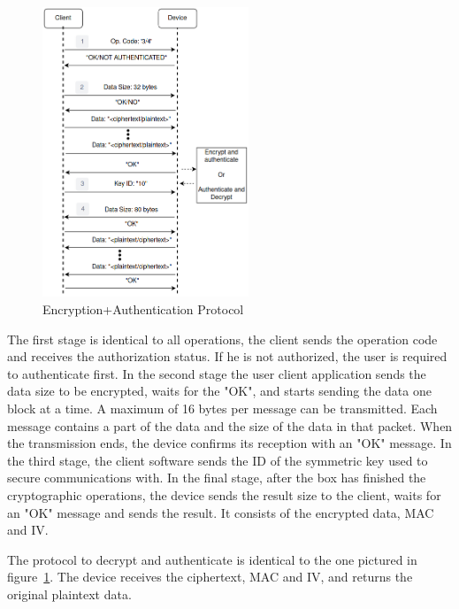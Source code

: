 \begin{figure}[h!]
	\centering
	\includegraphics[width=0.55\textwidth]{./Images/data-exchange.png}
	\caption{Encryption+Authentication Protocol}
	\label{fig:protocol:data-exchange}
\end{figure}

The first stage is identical to all operations, the client sends the operation code and receives the authorization status. If he is not authorized, the user is required to authenticate first.
In the second stage the user client application sends the data size to be encrypted, waits for the "OK", and starts sending the data one block at a time.
A maximum of 16 bytes per message can be transmitted. Each message contains a part of the data and the size of the data in that packet. When the transmission ends, the device confirms its reception with an "OK" message.
In the third stage, the client software sends the ID of the symmetric key used to secure communications with.
In the final stage, after the box has finished the cryptographic operations, the device sends the result size to the client, waits for an "OK" message and sends the result. It consists of the encrypted data, MAC and IV.

The protocol to decrypt and authenticate is identical to the one pictured in figure~\ref{fig:protocol:data-exchange}. The device receives the ciphertext, \ac{MAC} and \ac{IV}, and returns the original plaintext data.

\hfill
\hfill



